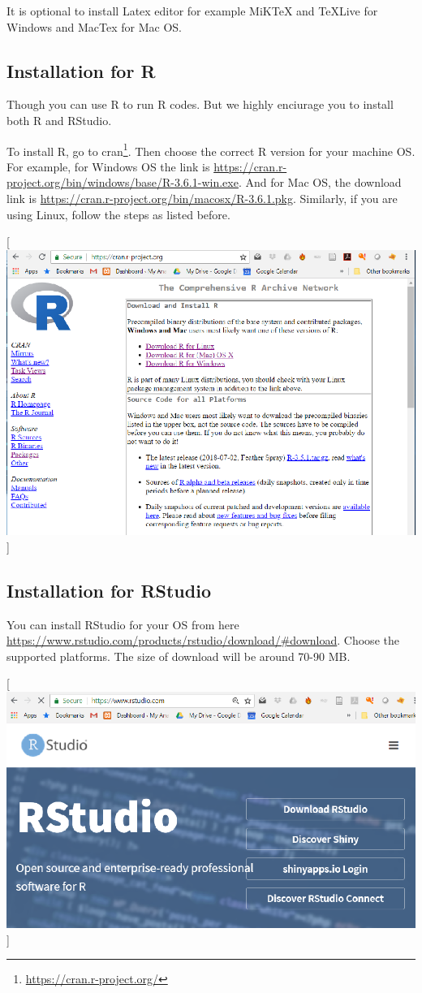 \documentclass[
]{book}
\renewcommand{\href}[2]{#2\footnote{\url{#1}}}
\begin{document}
It is optional to install Latex editor for example MiKTeX and TeXLive for Windows and MacTex for Mac OS.

\hypertarget{installation-for-r}{%
\subsection{Installation for R}\label{installation-for-r}}

Though you can use R to run R codes. But we highly enciurage you to install both R and RStudio.

To install R, go to \href{https://cran.r-project.org/}{cran}. Then choose the correct R version for your machine OS. For example, for Windows OS the link is \url{https://cran.r-project.org/bin/windows/base/R-3.6.1-win.exe}. And for Mac OS, the download link is \url{https://cran.r-project.org/bin/macosx/R-3.6.1.pkg}. Similarly, if you are using Linux, follow the steps as listed before.

{[}\includegraphics{cran.PNG}{]}

\hypertarget{installation-for-rstudio}{%
\subsection{Installation for RStudio}\label{installation-for-rstudio}}

You can install RStudio for your OS from here \url{https://www.rstudio.com/products/rstudio/download/\#download}. Choose the supported platforms. The size of download will be around 70-90 MB.

{[}\includegraphics{rstudio2.PNG}{]}
\end{document}
